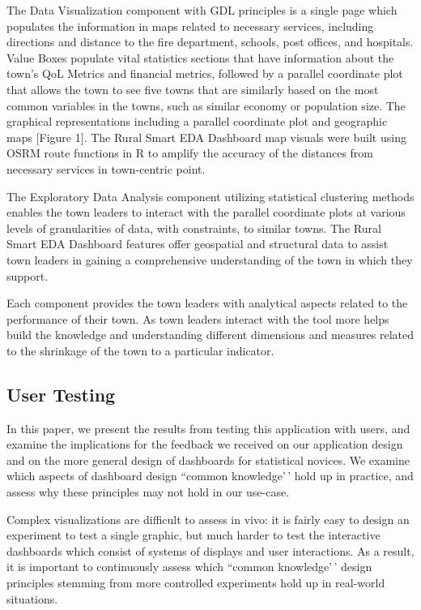 \documentclass[letterpaper,inpress]{jdsart}
\begin{document}
The Data Visualization component with GDL principles is a single page which populates the information in maps related to necessary services, including directions and distance to the fire department, schools, post offices, and hospitals. Value Boxes populate vital statistics sections that have information about the town's QoL Metrics and financial metrics, followed by a parallel coordinate plot that allows the town to see five towns that are similarly based on the most common variables in the towns, such as similar economy or population size. The graphical representations including a parallel coordinate plot and geographic maps {[}Figure 1{]}. The Rural Smart EDA Dashboard map visuals were built using OSRM route functions in R to amplify the accuracy of the distances from necessary services in town-centric point.

The Exploratory Data Analysis component utilizing statistical clustering methods enables the town leaders to interact with the parallel coordinate plots at various levels of granularities of data, with constraints, to similar towns. The Rural Smart EDA Dashboard features offer geospatial and structural data to assist town leaders in gaining a comprehensive understanding of the town in which they support.

Each component provides the town leaders with analytical aspects related to the performance of their town. As town leaders interact with the tool more helps build the knowledge and understanding different dimensions and measures related to the shrinkage of the town to a particular indicator.

\subsection{User Testing}

In this paper, we present the results from testing this application with users, and examine the implications for the feedback we received on our application design and on the more general design of dashboards for statistical novices. We examine which aspects of dashboard design ``common knowledge'\,' hold up in practice, and assess why these principles may not hold in our use-case.

Complex visualizations are difficult to assess in vivo: it is fairly easy to design an experiment to test a single graphic, but much harder to test the interactive dashboards which consist of systems of displays and user interactions. As a result, it is important to continuously assess which ``common knowledge'\,' design principles stemming from more controlled experiments hold up in real-world situations.
\end{document}
